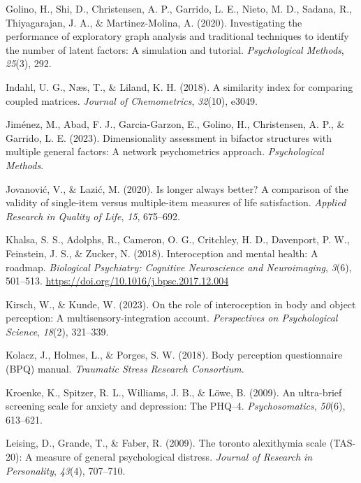 \documentclass[
  man,
  floatsintext,
  longtable,
  nolmodern,
  notxfonts,
  notimes,
  mask,
  colorlinks=true,linkcolor=blue,citecolor=blue,urlcolor=blue]{apa7}
\newlength{\cslhangindent}
\newenvironment{CSLReferences}[2] %
 {\begin{list}{}{%
  \setlength{\itemindent}{0pt}
  \setlength{\leftmargin}{0pt}
  \setlength{\parsep}{0pt}
  \ifodd #1
   \setlength{\leftmargin}{\cslhangindent}
   \setlength{\itemindent}{-1\cslhangindent}
  \fi
  \setlength{\itemsep}{#2\baselineskip}}}
 {\end{list}}
\begin{document}
\begin{CSLReferences}{1}{0}
Golino, H., Shi, D., Christensen, A. P., Garrido, L. E., Nieto, M. D.,
Sadana, R., Thiyagarajan, J. A., \& Martinez-Molina, A. (2020).
Investigating the performance of exploratory graph analysis and
traditional techniques to identify the number of latent factors: A
simulation and tutorial. \emph{Psychological Methods}, \emph{25}(3),
292.

Indahl, U. G., Næs, T., \& Liland, K. H. (2018). A similarity index for
comparing coupled matrices. \emph{Journal of Chemometrics},
\emph{32}(10), e3049.

Jiménez, M., Abad, F. J., Garcia-Garzon, E., Golino, H., Christensen, A.
P., \& Garrido, L. E. (2023). Dimensionality assessment in bifactor
structures with multiple general factors: A network psychometrics
approach. \emph{Psychological Methods}.

Jovanović, V., \& Lazić, M. (2020). Is longer always better? A
comparison of the validity of single-item versus multiple-item measures
of life satisfaction. \emph{Applied Research in Quality of Life},
\emph{15}, 675--692.

Khalsa, S. S., Adolphs, R., Cameron, O. G., Critchley, H. D., Davenport,
P. W., Feinstein, J. S., \& Zucker, N. (2018). Interoception and mental
health: A roadmap. \emph{Biological Psychiatry: Cognitive Neuroscience
and Neuroimaging}, \emph{3}(6), 501--513.
\url{https://doi.org/10.1016/j.bpsc.2017.12.004}

Kirsch, W., \& Kunde, W. (2023). On the role of interoception in body
and object perception: A multisensory-integration account.
\emph{Perspectives on Psychological Science}, \emph{18}(2), 321--339.

Kolacz, J., Holmes, L., \& Porges, S. W. (2018). Body perception
questionnaire (BPQ) manual. \emph{Traumatic Stress Research Consortium}.

Kroenke, K., Spitzer, R. L., Williams, J. B., \& Löwe, B. (2009). An
ultra-brief screening scale for anxiety and depression: The PHQ--4.
\emph{Psychosomatics}, \emph{50}(6), 613--621.

Leising, D., Grande, T., \& Faber, R. (2009). The toronto alexithymia
scale (TAS-20): A measure of general psychological distress.
\emph{Journal of Research in Personality}, \emph{43}(4), 707--710.


\end{CSLReferences}
\end{document}
